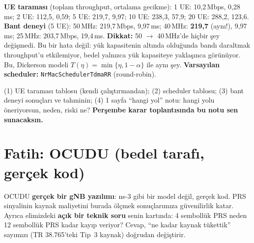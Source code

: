 \documentclass[10.5pt,a4paper]{article}
\begin{document}
\begin{kontrol}
\textbf{UE taraması} (toplam throughput, ortalama gecikme): 1 UE: 10,2\,Mbps, 0,28\,ms; 2 UE: 112,5, 0,59; 5 UE: 219,7, 9,97; 10 UE: 238,3, 57,9; 20 UE: 288,2, 123,6.
\textbf{Bant deneyi} (5 UE): 50\,MHz: 219,7\,Mbps, 9,97\,ms; 40\,MHz: \textbf{219,7} (aynı!), 9,97\,ms; 25\,MHz: 203,7\,Mbps, 19,4\,ms.
\textbf{Dikkat:} 50 $\rightarrow$ 40\,MHz'de hiçbir şey değişmedi. Bu bir hata değil: yük kapasitenin altında olduğunda bandı daraltmak throughput'u etkilemiyor, bedel yalnızca yük kapasiteye yaklaşınca görünüyor. Bu, Dickerson modeli $T(\eta)=\min\{\eta,1-\alpha\}$ ile aynı şey. \textbf{Varsayılan scheduler:} \texttt{NrMacSchedulerTdmaRR} (round-robin).
\end{kontrol}

\begin{teslim}
(1) UE taraması tablosu (kendi çalıştırmandan); (2) scheduler tablosu; (3) bant deneyi sonuçları ve tahminin; (4) 1 sayfa ``hangi yol'' notu: hangi yolu öneriyorsun, neden, riski ne? \textbf{Perşembe karar toplantısında bu notu sen sunacaksın.}
\end{teslim}

\clearpage
\section*{Fatih: OCUDU (bedel tarafı, gerçek kod)}
\begin{neden}
OCUDU \textbf{gerçek bir gNB yazılımı}: ns-3 gibi bir model değil, gerçek kod. PRS sinyalinin kaynak maliyetini burada ölçmek sonuçlarımıza güvenilirlik katar. Ayrıca elimizdeki \textbf{açık bir teknik soru} senin kartında: 4 sembollük PRS neden 12 sembollük PRS kadar kayıp veriyor? Cevap, ``ne kadar kaynak tükettik'' sayımızı (TR 38.765'teki Tip~3 kaynak) doğrudan değiştirir.
\end{neden}
\end{document}
